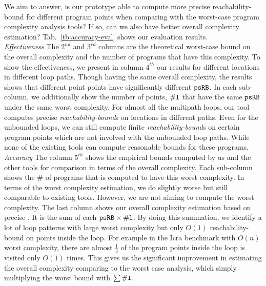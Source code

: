 We aim to answer, is our prototype able to compute more precise reachability-bound for different program points when comparing with the worst-case program
complexity analysis tools? If so, can we also have better overall complexity estimation?
Tab.~\ref{tb:accuracy-eval} shows our evaluation results.
\\
\emph{Effectiveness}
\newcommand{\pointnum}{\kw{\# l}}
The $2^{nd}$ and $3^{rd}$ columns are the theoretical worst-case bound on the overall complexity and the number of programs that have this complexity.
To show the effectiveness, 
we present in column $4^{th}$ our results for different locations in different loop paths. 
Though having the same overall complexity, the results shows that different point points have significantly different $\mathtt{psRB}$.
In each sub-column, we additionally show the number of points, $\pointnum$ that have the same $\mathtt{psRB}$ under the same worst complexity.
For almost all the multipath loops, our tool computes precise \emph{reachability-bound}s on locations in different paths.
Even for the unbounded loops, we can still compute finite \emph{reachability-bound}s on certain program points which are not involved with the unbounded loop paths.
While none of the existing tools can compute reasonable bounds for these programs.
\\
\emph{Accuracy} 
The column $5^{th}$ shows the empirical bounds computed by us and the other tools for comparison in terms of the overall complexity. Each sub-column shows the $\#$ of programs that is computed to have this worst complexity.
In terms of the worst complexity estimation, we do slightly worse but still comparable to existing tools. However, we are not aiming to compute the worst complexity.
The last column shows our overall complexity estimation based on precise {\THESYSTEM}.
It is the sum of each $\psRB \times \pointnum$.
By doing this summation, we identify a lot of loop patterns with large worst complexity but only $O(1)$ reachability-bound on points inside the loop.
For example in the Icra benchmark with $O(n)$ worst complexity,
there are almost $\frac{1}{3}$ of the program points inside the loop is visited only $O(1)$ times.
This gives us the significant improvement in estimating the overall complexity comparing to the worst case analysis, which simply multiplying the worst bound with $\sum\pointnum$.
